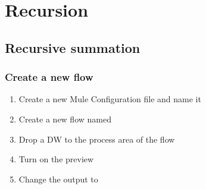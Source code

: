 \chapter{Recursion}


\section{Recursive summation}

\subsection{Create a new flow}
\begin{enumerate}
\item Create a new Mule Configuration file and name it 
\item Create a new flow named 
\item Drop a DW to the process area of the flow
\item Turn on the preview
\item Change the output to 
\end{enumerate}


